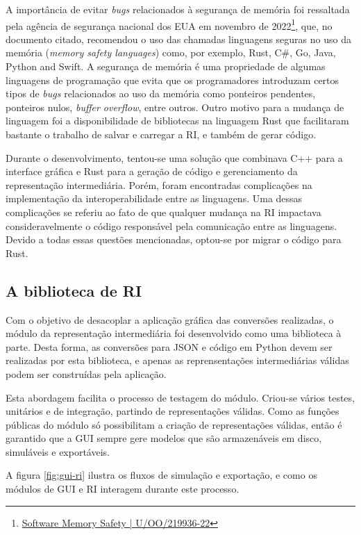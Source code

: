 \documentclass[
	12pt,				%
	openright,			%
	oneside,			%
	a4paper,			%
	main=brazil,
	english,			%
	]{ufsj-abntex2}
\begin{document}
A importância de evitar \textit{bugs} relacionados à segurança de memória foi ressaltada pela agência de segurança nacional dos EUA em novembro de 2022\footnote{\href{https://media.defense.gov/2022/Nov/10/2003112742/-1/-1/0/CSI_SOFTWARE_MEMORY_SAFETY.PDF}{Software Memory Safety | U/OO/219936-22}}, que, no documento citado, recomendou o uso das chamadas linguagens seguras no uso da memória (\textit{memory safety languages}) como, por exemplo, Rust, C\#, Go, Java, Python and Swift. A segurança de memória é uma propriedade de algumas linguagens de programação que evita que os programadores introduzam certos tipos de \textit{bugs} relacionados ao uso da memória como ponteiros pendentes, ponteiros nulos, \textit{buffer overflow}, entre outros. Outro motivo para a mudança de linguagem foi a disponibilidade de bibliotecas na linguagem Rust que facilitaram bastante o trabalho de salvar e carregar a RI, e também de gerar código. 

Durante o desenvolvimento, tentou-se uma solução que combinava C++ para a interface gráfica e Rust para a geração de código e gerenciamento da representação intermediária. Porém, foram encontradas complicações na implementação da interoperabilidade entre as linguagens. Uma dessas complicações se referiu ao fato de que qualquer mudança na RI impactava consideravelmente o código responsável pela comunicação entre as linguagens. Devido a todas essas questões mencionadas, optou-se por migrar o código para Rust. 


\subsection{A biblioteca de RI}
\label{sub:ri}

Com o objetivo de desacoplar a aplicação gráfica das conversões realizadas, o módulo da representação intermediária foi desenvolvido como uma biblioteca à parte. Desta forma, as conversões para JSON e código em Python devem ser realizadas por esta biblioteca, e apenas as reprensentações intermediárias válidas podem ser construídas pela aplicação.

Esta abordagem facilita o processo de testagem do módulo. Criou-se vários testes, unitários e de integração, partindo de representações válidas. Como as funções públicas do módulo só possibilitam a criação de representações válidas, então é garantido que a GUI sempre gere modelos que são armazenáveis em disco, simuláveis e exportáveis.

A figura \ref{fig:gui-ri} ilustra os fluxos de simulação e exportação, e como os módulos de GUI e RI interagem durante este processo.
\end{document}
